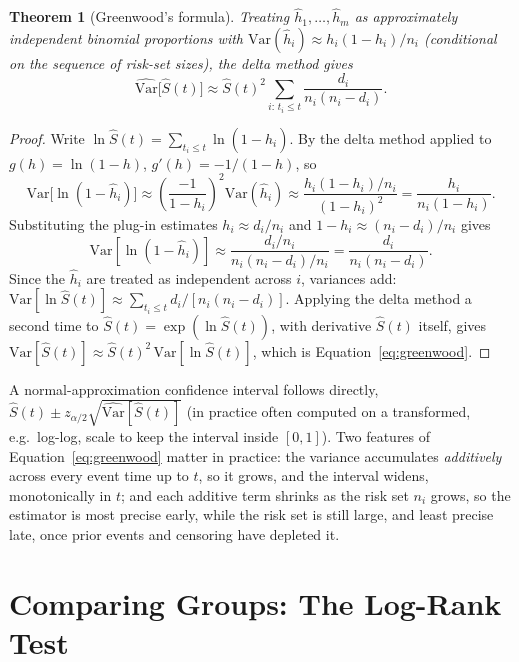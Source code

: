 \documentclass[11pt]{article}
\newtheorem{theorem}{Theorem}
\theoremstyle{remark}
\theoremstyle{definition}
\begin{document}
\begin{theorem}[Greenwood's formula]
\label{thm:greenwood}
Treating $\hat h_1,\ldots,\hat h_m$ as approximately independent binomial proportions with $\mathrm{Var}(\hat h_i)\approx h_i(1-h_i)/n_i$ (conditional on the sequence of risk-set sizes), the delta method gives
\begin{equation}
\widehat{\mathrm{Var}}\big[\hat S(t)\big] \approx \hat S(t)^2\sum_{i:\,t_i\le t}\frac{d_i}{n_i(n_i-d_i)}.
\label{eq:greenwood}
\end{equation}
\end{theorem}
\begin{proof}
Write $\ln\hat S(t) = \sum_{t_i\le t}\ln(1-\hat h_i)$. By the delta method applied to $g(h)=\ln(1-h)$, $g'(h)=-1/(1-h)$, so
\begin{equation*}
\mathrm{Var}\big[\ln(1-\hat h_i)\big] \approx \left(\frac{-1}{1-h_i}\right)^2\mathrm{Var}(\hat h_i) \approx \frac{h_i(1-h_i)/n_i}{(1-h_i)^2} = \frac{h_i}{n_i(1-h_i)}.
\end{equation*}
Substituting the plug-in estimates $h_i\approx d_i/n_i$ and $1-h_i\approx (n_i-d_i)/n_i$ gives
\begin{equation*}
\mathrm{Var}[\ln(1-\hat h_i)]\approx \frac{d_i/n_i}{n_i(n_i-d_i)/n_i} = \frac{d_i}{n_i(n_i-d_i)}.
\end{equation*}
Since the $\hat h_i$ are treated as independent across $i$, variances add: $\mathrm{Var}[\ln\hat S(t)]\approx\sum_{t_i\le t}d_i/[n_i(n_i-d_i)]$. Applying the delta method a second time to $\hat S(t)=\exp(\ln\hat S(t))$, with derivative $\hat S(t)$ itself, gives $\mathrm{Var}[\hat S(t)]\approx \hat S(t)^2\,\mathrm{Var}[\ln\hat S(t)]$, which is Equation~\eqref{eq:greenwood}.
\end{proof}

A normal-approximation confidence interval follows directly, $\hat S(t)\pm z_{\alpha/2}\sqrt{\widehat{\mathrm{Var}}[\hat S(t)]}$ (in practice often computed on a transformed, e.g.\ log-log, scale to keep the interval inside $[0,1]$). Two features of Equation~\eqref{eq:greenwood} matter in practice: the variance accumulates \emph{additively} across every event time up to $t$, so it grows, and the interval widens, monotonically in $t$; and each additive term shrinks as the risk set $n_i$ grows, so the estimator is most precise early, while the risk set is still large, and least precise late, once prior events and censoring have depleted it.

\section{Comparing Groups: The Log-Rank Test}
\label{sec:logrank}
\end{document}
